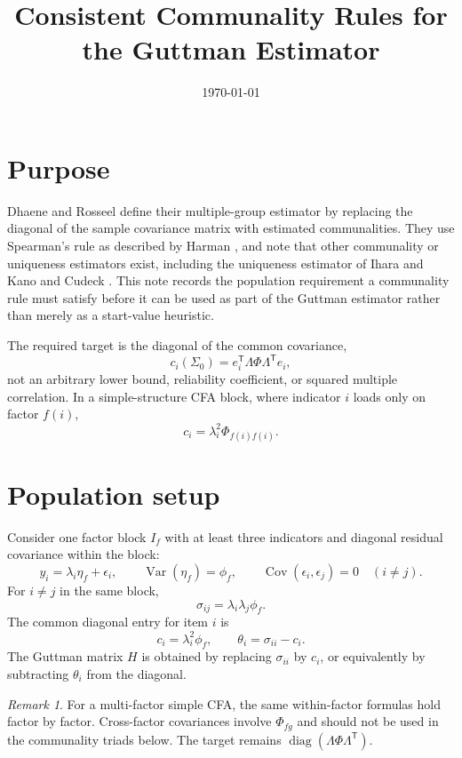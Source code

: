 \documentclass[11pt]{article}
\title{Consistent Communality Rules for the Guttman Estimator}
\author{}
\date{\today}
\newcommand{\T}{^{\mathsf T}}
\newcommand{\Var}{\operatorname{Var}}
\newcommand{\Cov}{\operatorname{Cov}}
\newcommand{\diag}{\operatorname{diag}}
\theoremstyle{plain}
\theoremstyle{remark}
\newtheorem*{remark}{Remark}
\begin{document}
\maketitle

\section*{Purpose}

Dhaene and Rosseel \cite{dhaene2024} define their multiple-group estimator by
replacing the diagonal of the sample covariance matrix with estimated
communalities. They use Spearman's rule as described by Harman
\cite{harman1976}, and note that other communality or uniqueness estimators
exist, including the uniqueness estimator of Ihara and Kano \cite{iharakano1986}
and Cudeck \cite{cudeck1991}. This note records the population requirement a
communality rule must satisfy before it can be used as part of the Guttman
estimator rather than merely as a start-value heuristic.

The required target is the diagonal of the common covariance,
\[
  c_i(\Sigma_0)
  =
  e_i\T \Lambda\Phi\Lambda\T e_i,
\]
not an arbitrary lower bound, reliability coefficient, or squared multiple
correlation. In a simple-structure CFA block, where indicator \(i\) loads only
on factor \(f(i)\),
\[
  c_i=\lambda_i^2\Phi_{f(i)f(i)}.
\]

\section{Population setup}

Consider one factor block \(I_f\) with at least three indicators and diagonal
residual covariance within the block:
\begin{equation}\label{eq:block-model}
  y_i=\lambda_i\eta_f+\epsilon_i,\qquad
  \Var(\eta_f)=\phi_f,\qquad
  \Cov(\epsilon_i,\epsilon_j)=0\quad(i\ne j).
\end{equation}
For \(i\ne j\) in the same block,
\[
  \sigma_{ij}=\lambda_i\lambda_j\phi_f.
\]
The common diagonal entry for item \(i\) is
\[
  c_i=\lambda_i^2\phi_f,
  \qquad
  \theta_i=\sigma_{ii}-c_i.
\]
The Guttman matrix \(H\) is obtained by replacing \(\sigma_{ii}\) by \(c_i\), or
equivalently by subtracting \(\theta_i\) from the diagonal.

\begin{remark}
For a multi-factor simple CFA, the same within-factor formulas hold factor by
factor. Cross-factor covariances involve \(\Phi_{fg}\) and should not be used in
the communality triads below. The target remains
\(\diag(\Lambda\Phi\Lambda\T)\).
\end{remark}
\end{document}
